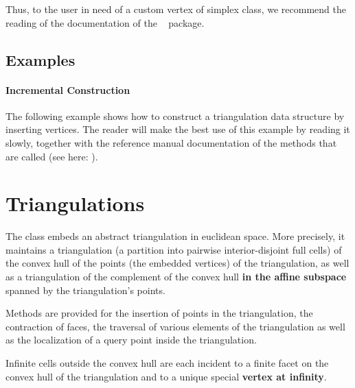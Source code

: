 \begin{ccAdvanced}
Thus, to the user in need of a custom vertex of simplex class, we recommend
the reading of the documentation of the \cgal\  package.
\end{ccAdvanced}


\subsection{Examples\label{triangulation:tds:examples}}
 
\paragraph{Incremental Construction}
The following example shows how to construct a triangulation data structure by
inserting vertices. The reader will make the best use of this example by
reading it slowly, together with the reference manual documentation of the
methods that are called (see here: ).




\section{Triangulations}

The class  embeds an abstract 
triangulation in euclidean space. More precisely, it
maintains a triangulation (a partition into pairwise interior-disjoint full
cells) of the convex hull of the points (the embedded vertices) of the
triangulation, as well as a triangulation of the complement of the convex hull
\textbf{in the affine subspace} spanned by the triangulation's points.

Methods are provided for the insertion of points in the triangulation, the
contraction of faces, the traversal of various elements of the triangulation
as well as the localization of a query point inside the triangulation.

Infinite cells outside the convex hull are each incident to
a finite facet on the convex hull of the triangulation and to a unique special
\textbf{vertex at infinity}. 

